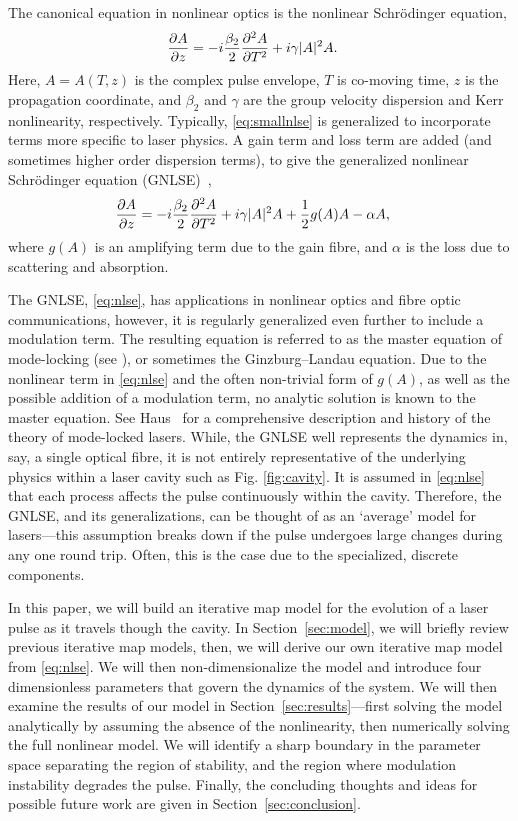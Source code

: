 \documentclass[9pt,twocolumn,twoside]{osajnl}
\newcommand{\pdiff}[3][\hspace{-0.5pt}]{\frac{\partial^{#1}#2}{\partial{#3}^{#1}}} %
\begin{document}
The canonical equation in nonlinear optics is the nonlinear Schr\"odinger equation,
\begin{align}
	\pdiff{A}{z} &= - i \frac{\beta_2}{2}\pdiff[2]{A}{T} + i \gamma |A|^2 A.
	\label{eq:smallnlse}
\end{align}
Here, $A = A(T, z)$ is the complex pulse envelope, $T$ is co-moving time, $z$ is the propagation coordinate, and $\beta_2$ and $\gamma$ are the group velocity dispersion and Kerr nonlinearity, respectively. Typically, \eqref{eq:smallnlse} is generalized to incorporate terms more specific to laser physics. A gain term and loss term are added (and sometimes higher order dispersion terms), to give the generalized nonlinear Schr\"odinger equation (GNLSE)~\cite{agrawal2013, bohun2015, finot2008, peng2018, shtyrina2017, yarutkina2013},
	\begin{align}
	\pdiff{A}{z} &= - i \frac{\beta_2}{2}\pdiff[2]{A}{T} + i \gamma |A|^2 A + \frac{1}{2}g(A) A - \alpha A,
	\label{eq:nlse}
\end{align}
where $g(A)$ is an amplifying term due to the gain fibre, and $\alpha$ is the loss due to scattering and absorption.

The GNLSE, \eqref{eq:nlse}, has applications in nonlinear optics and fibre optic communications, however, it is regularly generalized even further to include a modulation term. The resulting equation is referred to as the master equation of mode-locking (see \cite{haus1975, haus1984, haus2000, tamura1996, usechak2005}), or sometimes the Ginzburg--Landau equation. Due to the nonlinear term in \eqref{eq:nlse} and the often non-trivial form of $g(A)$, as well as the possible addition of a modulation term, no analytic solution is known to the master equation. See Haus~\cite{haus2000} for a comprehensive description and history of the theory of mode-locked lasers. While, the GNLSE well represents the dynamics in, say, a single optical fibre, it is not entirely representative of the underlying physics within a laser cavity such as Fig. \ref{fig:cavity}. It is assumed in \eqref{eq:nlse} that each process affects the pulse continuously within the cavity. Therefore, the GNLSE, and its generalizations, can be thought of as an `average' model for lasers---this assumption breaks down if the pulse undergoes large changes during any one round trip. Often, this is the case due to the specialized, discrete components.

In this paper, we will build an iterative map model for the evolution of a laser pulse as it travels though the cavity. In Section~\ref{sec:model}, we will briefly review previous iterative map models, then, we will derive our own iterative map model from \eqref{eq:nlse}. We will then non-dimensionalize the model and introduce four dimensionless parameters that govern the dynamics of the system. We will then examine the results of our model in Section~\ref{sec:results}---first solving the model analytically by assuming the absence of the nonlinearity, then numerically solving the full nonlinear model. We will identify a sharp boundary in the parameter space separating the region of stability, and the region where modulation instability degrades the pulse. Finally, the concluding thoughts and ideas for possible future work are given in Section~\ref{sec:conclusion}.
\end{document}
